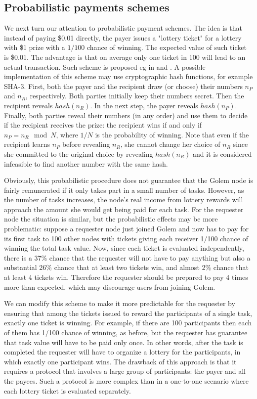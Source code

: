 \documentclass[a4paper]{article}
\begin{document}
\subsection{Probabilistic payments schemes}
    We next turn our attention to probabilistic payment schemes. The idea is that instead of paying \$0.01 directly,
    the payer issues a "lottery ticket" for a lottery with \$1 prize with a $1/100$ chance of winning. The expected
    value of such ticket is \$0.01. The advantage is that on average only one ticket in 100 will lead to an actual
    transaction. Such scheme is proposed eg in \cite{RIVEST} and \cite{WHEELER}.
    A possible implementation of this scheme may use cryptographic hash functions, for example SHA-3. First, both
    the payer and the recipient draw (or choose) their numbers $n_P$ and $n_R$, respectively.
    Both parties initially keep their numbers secret. Then the recipient reveals $hash(n_R)$. In the next step,
    the payer reveals $hash(n_P)$. Finally, both parties reveal their numbers (in any order) and use them to decide
    if the recipient receives the prize: the recipient wins if and only if $n_P = n_R \mod N$, where $1/N$ is
    the probability of winning. Note that even if the recipient learns $n_P$ before revealing $n_R$, she cannot change
    her choice of $n_R$ since she committed to the original choice by revealing $hash(n_R)$ and it is considered
    infeasible to find another number with the same hash.

    Obviously, this probabilistic procedure does not guarantee that the Golem node is fairly remunerated if it only
    takes part in a small number of tasks. However, as the number of tasks increases, the node's real income from
    lottery rewards will approach the amount she would get being paid for each task. For the requester node the
    situation is similar, but the probabilistic effects may be more problematic: suppose a requester node just
    joined Golem and now has to pay for its first task to 100 other nodes with tickets giving each receiver
    1/100 chance of winning the total task value. Now, since each ticket is evaluated independently,
    there is a 37\% chance that the requester will not have to pay anything but also a substantial 26\% chance that
    at least two tickets win, and almost 2\% chance that at least 4 tickets win. Therefore the requester should be
    prepared to pay 4 times more than expected, which may discourage users from joining Golem.

    We can modify this scheme to make it more predictable for the requester by ensuring that among the tickets issued
    to reward the participants of a single task, exactly one ticket is winning. For example, if there are 100
    participants then each of them has 1/100 chance of winning, as before, but the requester has guarantee that
    task value will have to be paid only once. In other words, after the task is completed the requester will have
    to organize a lottery for the participants, in which exactly one participant wins. The drawback of this approach
    is that it requires a protocol that involves a large group of participants: the payer and all the payees.
    Such a protocol is more complex than in a one-to-one scenario where each lottery ticket is evaluated separately.
\end{document}
